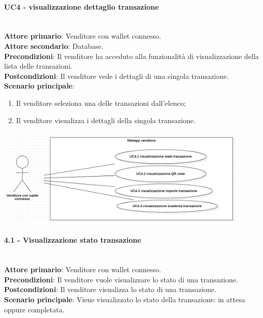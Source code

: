\documentclass[a4paper, 12pt]{article}
\begin{document}
\paragraph{UC4 - visualizzazione dettaglio transazione}\\
\textbf{Attore primario}: Venditore con wallet connesso.\\
\textbf{Attore secondario}: Database.\\
\textbf{Precondizioni}: Il venditore ha acceduto alla funzionalità di visualizzazione della lista delle transazioni.\\
\textbf{Postcondizioni}: Il venditore vede i dettagli di una singola transazione.\\
\textbf{Scenario principale}:
\begin{enumerate}
\item Il venditore seleziona una delle transazioni dall'elenco;
\item Il venditore visualizza i dettagli della singola transazione.
\end{enumerate}

\includegraphics[width=0.9\textwidth]{UC_WAV4}

\paragraph{4.1 - Visualizzazione stato transazione}\\
\textbf{Attore primario}: Venditore con wallet connesso.\\
\textbf{Precondizioni}: Il venditore vuole visualizzare lo stato di una transazione.\\
\textbf{Postcondizioni}: Il venditore visualizza lo stato di una transazione.\\
\textbf{Scenario principale}: Viene visualizzato lo stato della transazione: in attesa oppure completata.\\
\end{document}

